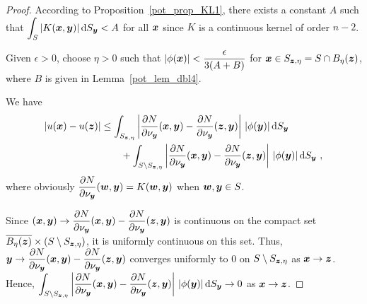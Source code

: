 \begin{proof}
According to Proposition~\ref{pot_prop_KL1}, there exists a constant $A$
such that $\displaystyle \int_S |K({\bm{x}},{\bm{y}})| \,\mathrm{d}{S}_{{\bm{y}}} < A$
for all ${\bm{x}}$ since $K$ is a continuous kernel of order $n-2$.

Given $\epsilon > 0$, choose $\eta > 0$ such that
$\displaystyle |\phi({\bm{x}})| < \frac{\epsilon}{3(A+B)}$
for ${\bm{x}} \in S_{{\bm{z}},\eta} = S \cap B_{\eta}({\bm{z}})$, where $B$ is
given in Lemma~\ref{pot_lem_dbl4}.

We have
\begin{equation} \label{potLemDbl5equ1}
\begin{split}
|u({\bm{x}}) - u({\bm{z}})|
& \leq \int_{S_{{\bm{z}},\eta}} \left| \frac{\partial{N}}{\partial \nu_{{\bm{y}}}}
({\bm{x}},{\bm{y}}) - \frac{\partial{N}}{\partial \nu_{{\bm{y}}}} ({\bm{z}},{\bm{y}})
\right|\,|\phi({\bm{y}})| \,\mathrm{d}{S}_{{\bm{y}}} \\
&\qquad + \int_{S \setminus S_{{\bm{z}},\eta}} \left| \frac{\partial{N}}{\partial \nu_{{\bm{y}}}}
({\bm{x}},{\bm{y}}) - \frac{\partial{N}}{\partial \nu_{{\bm{y}}}} ({\bm{z}},{\bm{y}})
\right|\,|\phi({\bm{y}})| \,\mathrm{d}{S}_{{\bm{y}}} \ ,
\end{split}
\end{equation}
where obviously
$\displaystyle \frac{\partial{N}}{\partial \nu_{{\bm{y}}}} ({\bm{w}},{\bm{y}})
= K({\bm{w}},{\bm{y}})$ when ${\bm{w}}, {\bm{y}} \in S$.

Since
$\displaystyle ({\bm{x}},{\bm{y}}) \to 
\frac{\partial{N}}{\partial \nu_{{\bm{y}}}}
({\bm{x}},{\bm{y}}) - \frac{\partial{N}}{\partial \nu_{{\bm{y}}}} ({\bm{z}},{\bm{y}})$
is continuous on the compact set 
$\displaystyle
\overline{B_\eta({\bm{z}})} \times \left(S \setminus S_{{\bm{z}},\eta}\right)$,
it is uniformly continuous on this set.  Thus,
$\displaystyle {\bm{y}} \to
\frac{\partial{N}}{\partial \nu_{{\bm{y}}}}
({\bm{x}},{\bm{y}}) - \frac{\partial{N}}{\partial \nu_{{\bm{y}}}} ({\bm{z}},{\bm{y}})$
converges uniformly to $0$ on $S \setminus S_{{\bm{z}},\eta}$ as
${\bm{x}} \to {\bm{z}}$.  Hence,
$\displaystyle
\int_{S \setminus S_{{\bm{z}},\eta}} \left| \frac{\partial{N}}{\partial \nu_{{\bm{y}}}}
({\bm{x}},{\bm{y}}) - \frac{\partial{N}}{\partial \nu_{{\bm{y}}}} ({\bm{z}},{\bm{y}})
\right|\,|\phi({\bm{y}})| \,\mathrm{d}{S}_{{\bm{y}}} \to 0$ as
${\bm{x}} \to {\bm{z}}$.


\end{proof}
